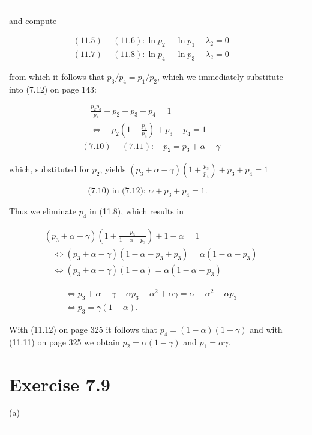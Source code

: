 \documentclass[10pt]{book}
\begin{document}
\begin{center}
\begin{tabular}{|l|l|l|}
and compute

\begin{align*}
& (11.5)-(11.6): \ln p_{2}-\ln p_{1}+\lambda_{2}=0 \tag{11.9}\\
& (11.7)-(11.8): \ln p_{4}-\ln p_{3}+\lambda_{2}=0 \tag{11.10}
\end{align*}

from which it follows that $p_{3} / p_{4}=p_{1} / p_{2}$, which we immediately substitute into (7.12) on page 143:

\begin{align*}
& \quad \frac{p_{2} p_{3}}{p_{4}}+p_{2}+p_{3}+p_{4}=1 \\
& \quad \Leftrightarrow \quad p_{2}\left(1+\frac{p_{3}}{p_{4}}\right)+p_{3}+p_{4}=1 \tag{11.11}\\
& (7.10)-(7.11): \quad p_{2}=p_{3}+\alpha-\gamma
\end{align*}

which, substituted for $p_{2}$, yields $\left(p_{3}+\alpha-\gamma\right)\left(1+\frac{p_{3}}{p_{4}}\right)+p_{3}+p_{4}=1$

\begin{equation*}
\text{(7.10) in (7.12): } \alpha+p_{3}+p_{4}=1. \tag{11.12}
\end{equation*}

Thus we eliminate $p_{4}$ in (11.8), which results in

\begin{align*}
& \left(p_{3}+\alpha-\gamma\right)\left(1+\frac{p_{3}}{1-\alpha-p_{3}}\right)+1-\alpha=1 \tag{11.13}\\
& \quad \Leftrightarrow\left(p_{3}+\alpha-\gamma\right)\left(1-\alpha-p_{3}+p_{3}\right)=\alpha\left(1-\alpha-p_{3}\right) \tag{11.14}\\
& \quad \Leftrightarrow\left(p_{3}+\alpha-\gamma\right)(1-\alpha)=\alpha\left(1-\alpha-p_{3}\right) \tag{11.15}
\end{align*}

\begin{align*}
& \Leftrightarrow p_{3}+\alpha-\gamma-\alpha p_{3}-\alpha^{2}+\alpha \gamma=\alpha-\alpha^{2}-\alpha p_{3} \tag{11.16}\\
& \Leftrightarrow p_{3}=\gamma(1-\alpha). \tag{11.17}
\end{align*}

With (11.12) on page 325 it follows that $p_{4}=(1-\alpha)(1-\gamma)$ and with (11.11) on page 325 we obtain $p_{2}=\alpha(1-\gamma)$ and $p_{1}=\alpha \gamma$.

\section{Exercise 7.9}
(a)


\end{tabular}
\end{center}
\end{document}
